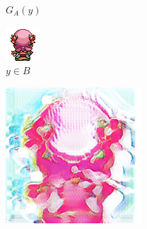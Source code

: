 \documentclass{beamer}
\begin{document}
\begin{frame}
\begin{figure}[htb]
\begin{subfigure}[b]{0.23\linewidth}
        \caption{$G_A(y)$}
      \end{subfigure}
      \begin{subfigure}[b]{0.23\linewidth}
        \includegraphics[width=\linewidth]{exp7_epoch061_real_B.png}
        \caption{$y \in B$}
      \end{subfigure}
      \begin{subfigure}[b]{0.23\linewidth}
        \includegraphics[width=\linewidth]{exp7_epoch061_fake_A.png}

\end{subfigure}
\end{figure}
\end{frame}
\end{document}

